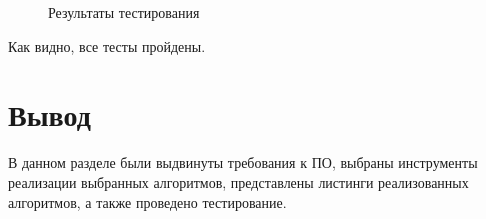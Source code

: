 \begin{figure}[h]
	\caption{Результаты тестирования}
	\label{tests}
\end{figure}

Как видно, все тесты пройдены.

\section{Вывод}
В данном разделе были выдвинуты требования к ПО, выбраны инструменты реализации выбранных алгоритмов, представлены листинги реализованных алгоритмов, а также проведено тестирование.
